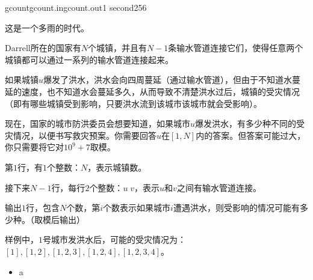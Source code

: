 \documentclass[11pt,a4paper,oneside]{article}
\begin{document}
\begin{problem}{gcount}{gcount.in}{gcount.out}{1 second}{256}
	
	这是一个多雨的时代。
	
	Darrell所在的国家有$N$个城镇，并且有$N-1$条输水管道连接它们，使得任意两个城镇都可以通过一系列的输水管道连接起来。
	
	如果城镇$u$爆发了洪水，洪水会向四周蔓延（通过输水管道），但由于不知道水蔓延的速度，也不知道水会蔓延多久，从而导致不清楚洪水过后，城镇的受灾情况（即有哪些城镇受到影响，只要洪水流到该城市该城市就会受影响）。
	
	现在，国家的城市防洪委员会想要知道，如果城市$u$爆发洪水，有多少种不同的受灾情况，以便书写救灾预案。你需要回答$u$在$[1,N]$内的答案。但答案可能过大，你只需要将它对$10^{9}+7$取模。
	
	\InputFile
	
	第$1$行，有$1$个整数：$N$，表示城镇数。
	
	接下来$N-1$行，每行$2$个整数：$u \; v$，表示$u$和$v$之间有输水管道连接。

	\OutputFile
	
	输出$1$行，包含$N$个数，第$i$个数表示如果城市$i$遭遇洪水，则受影响的情况可能有多少种。（取模后输出）

	\Example
	
	\begin{example}
\end{example}

\Note

	样例中，$1$号城市发洪水后，可能的受灾情况为：$[1], [1,2], [1,2,3], [1,2,4], [1,2,3,4]$。
	
	
		
	\begin{itemize}
		\item a
	\end{itemize}
\end{problem}
\end{document}
